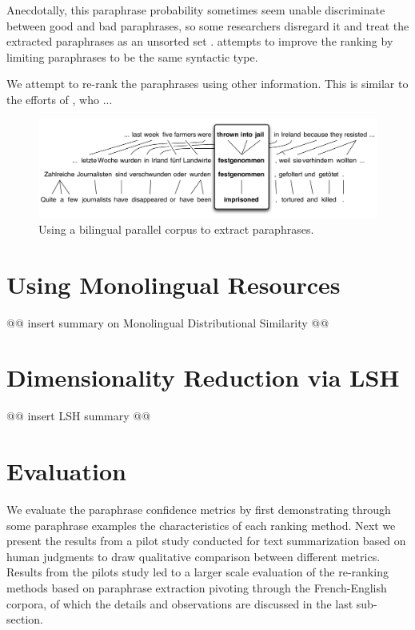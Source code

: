 \documentclass[11pt]{article}
\begin{document}
Anecdotally, this paraphrase probability sometimes seem unable discriminate between good and bad paraphrases, so some researchers disregard it and treat the extracted paraphrases as an unsorted set \cite{Snover2010}.   attempts to improve the ranking by limiting paraphrases to be the same syntactic type.  

We attempt to re-rank the paraphrases using other information.  This is similar to the efforts of , who ...



\begin{figure}
\begin{center}
\includegraphics[width=\linewidth]{pivot-2}
\end{center}
\caption{\small Using a bilingual parallel corpus to extract paraphrases.}
\label{paraphrase-illustration}
\end{figure}

\section{Using Monolingual Resources}
\label{sect:mds}

@@ insert summary on Monolingual Distributional Similarity @@

\section{Dimensionality Reduction via LSH}
\label{sect:lsh}

@@ insert LSH summary @@


\section{Evaluation}
We evaluate the paraphrase confidence metrics by first demonstrating through some paraphrase examples the characteristics of each ranking method. Next we present the results from a pilot study conducted for text summarization based on human judgments to draw qualitative comparison between different metrics. Results from the pilots study led to a larger scale evaluation of the re-ranking methods based on paraphrase extraction pivoting through the French-English corpora, of which the details and observations are discussed in the last sub-section.
\end{document}

